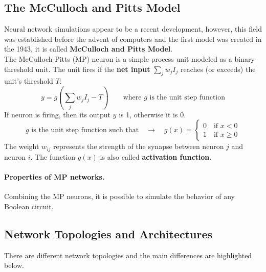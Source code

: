 \subsection{The McCulloch and Pitts Model}
Neural network simulations appear to be a recent development, however, this field was established before the advent of computers and the first model was created in the 1943, it is called \textbf{McCulloch and Pitts Model}.\\
The McCulloch-Pitts (MP) neuron is a simple process unit modeled as a binary threshold unit.
The unit fires if the \textbf{net input} $\sum_j w_jI_j$ reaches (or exceeds) the unit's threshold $T$:
$$y = g\left(\sum_j w_jI_j - T\right) \qquad \text{where } g \text{ is the unit step function}$$
If neuron is firing, then its output $y$ is 1, otherwise it is 0.
$$g \text{ is the unit step function such that} \quad \rightarrow \quad g(x) = 
\begin{cases}
0 \quad \text{if }x<0\\
1 \quad \text{if }x \geq 0
\end{cases}$$
The weight $w_{ij}$ represents the strength of the synapse between neuron $j$ and neuron $i$. The function $g(x)$ is also called \textbf{activation function}.

\paragraph*{Properties of MP networks.} Combining the MP neurons, it is possible to simulate the behavior of any Boolean circuit.

\subsection{Network Topologies and Architectures} There are different network topologies and the main differences are highlighted below.

